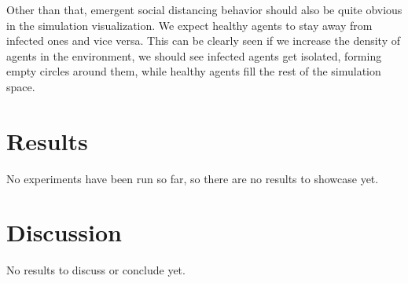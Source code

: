 \documentclass[9pt]{IEEEtran}
\begin{document}
Other than that, emergent social distancing behavior should also be quite obvious in the simulation visualization. We expect healthy agents to stay away from infected ones and vice versa. This can be clearly seen if we increase the density of agents in the environment, we should see infected agents get isolated, forming empty circles around them, while healthy agents fill the rest of the simulation space.

\section{Results}

No experiments have been run so far, so there are no results to showcase yet.

\section{Discussion}

No results to discuss or conclude yet.

\printbibliography
\end{document}
